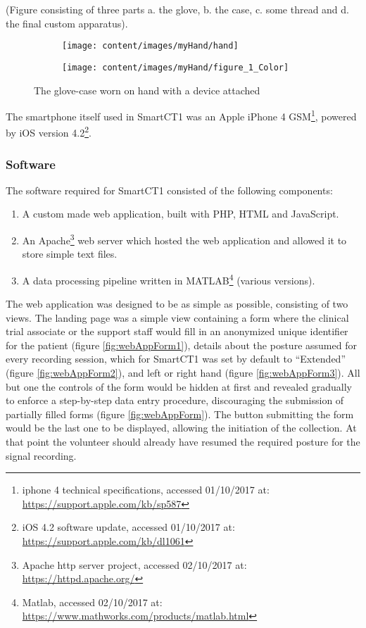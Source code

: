 (\textcolor{BurntOrange}{Figure consisting of three parts a. the glove, b. the case, c. some thread and d. the final custom apparatus}).

\begin{figure}[h]
\centering
\begin{subfigure}{.5\textwidth}
  \centering
  \texttt{[image: content/images/myHand/hand]}
\end{subfigure}%
\begin{subfigure}{.5\textwidth}
  \centering
  \texttt{[image: content/images/myHand/figure\_1\_Color]}
\end{subfigure}
\caption{The glove-case worn on hand with a device attached}
\label{fig:glovCase}
\end{figure}

The smartphone itself used in \gls{SmartCT1} was an Apple iPhone 4 GSM\footnote{iphone 4 technical specifications, accessed 01/10/2017 at: \url{https://support.apple.com/kb/sp587}}, powered by iOS version 4.2\footnote{iOS 4.2 software update, accessed 01/10/2017 at: \url{https://support.apple.com/kb/dl1061}}. 

\subsubsection{Software}
\label{subsubsec:smartCT1Software}
The software required for \gls{SmartCT1} consisted of the following components:

\begin{enumerate}
\item A custom made web application, built with PHP, HTML and JavaScript.
\item An Apache\footnote{Apache http server project, accessed 02/10/2017 at: \url{https://httpd.apache.org/}} web server which hosted the web application and allowed it to store simple text files.
\item A data processing pipeline written in MATLAB\footnote{Matlab, accessed 02/10/2017 at: \url{https://www.mathworks.com/products/matlab.html}} (various versions).
\end{enumerate}

The web application was designed to be as simple as possible, consisting of two views. The landing page was a simple view containing a form where the clinical trial associate or the support staff would fill in an anonymized unique identifier for the patient (figure \ref{fig:webAppForm1}), details about the posture assumed for every recording session, which for \gls{SmartCT1} was set by default to ``Extended'' (figure \ref{fig:webAppForm2}), and left or right hand (figure \ref{fig:webAppForm3}). All but one the controls of the form would be hidden at first and revealed gradually to enforce a step-by-step data entry procedure, discouraging the submission of partially filled forms (figure \ref{fig:webAppForm}). The button submitting the form would be the last one to be displayed, allowing the initiation of the collection. At that point the volunteer should already have resumed the required posture for the signal recording. 

